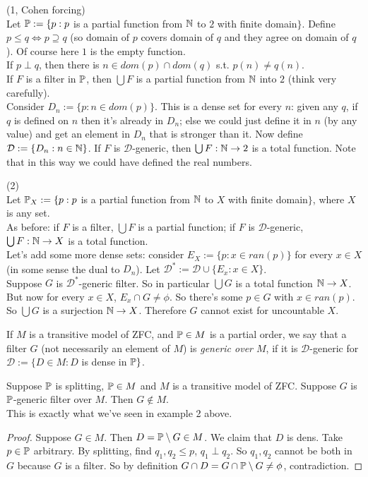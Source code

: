 \documentclass[a4paper]{article}
\begin{document}
\begin{eg} (1, Cohen forcing)\\
Let $\P := \{p: p$ is a partial function from $\N$ to $2$ with finite domain$\}$. Define $p \leq q \iff p \supseteq q$ (so domain of $p$ covers domain of $q$ and they agree on domain of $q$). Of course here $1$ is the empty function.\\
If $p\perp q$, then there is $n \in dom(p) \cap dom(q)$ s.t. $p(n) \neq q(n)$.\\
If $F$ is a filter in $\P$, then $\bigcup F$ is a partial function from $\N$ into $2$ (think very carefully).\\
Consider $D_n:=\{p:n \in dom(p)\}$. This is a dense set for every $n$: given any $q$, if $q$ is defined on $n$ then it's already in $D_n$; else we could just define it in $n$ (by any value) and get an element in $D_n$ that is stronger than it. Now define $\mathcal{D}:=\{D_n: n \in \N\}$. If $F$ is $\mathcal{D}$-generic, then $\bigcup F: \N \to 2$ is a total function. Note that in this way we could have defined the real numbers.
\end{eg}

\begin{eg} (2)\\
Let $\P_X := \{p:p$ is a partial function from $\N$ to $X$ with finite domain$\}$, where $X$ is any set.\\
As before: if $F$ is a filter, $\bigcup F$ is a partial function; if $F$ is $\mathcal{D}$-generic, $\bigcup F:\N \to X$ is a total function.\\
Let's add some more dense sets: consider $E_X:=\{p:x \in ran(p)\}$ for every $x \in X$ (in some sense the dual to $D_n$). Let $\mathcal{D}^* := \mathcal{D} \cup \{E_x: x \in X\}$.\\
Suppose $G$ is $\mathcal{D}^*$-generic filter. So in particular $\bigcup G$ is a total function $\N \to X$. But now for every $x \in X$, $E_x \cap G \neq \phi$. So there's some $p \in G$ with $x \in ran(p)$. So $\bigcup G$ is a surjection $\N \to X$. Therefore $G$ cannot exist for uncountable $X$.
\end{eg}

If $M$ is a transitive model of ZFC, and $\P \in M$ is a partial order, we say that a filter $G$ (not necessarily an element of $M$) is \emph{generic over $M$}, if it is $\mathcal{D}$-generic for $\mathcal{D}:=\{D \in M: D$ is dense in $\P\}$.

\begin{lemma}
Suppose $\P$ is splitting, $\P \in M$ and $M$ is a transitive model of ZFC. Suppose $G$ is $\P$-generic filter over $M$. Then $G \not\in M$.\\
This is exactly what we've seen in example 2 above.
\begin{proof}
Suppose $G \in M$. Then $D = \P\setminus G \in M$. We claim that $D$ is dens. Take $p \in \P$ arbitrary. By splitting, find $q_1,q_2 \leq p$, $q_1 \perp q_2$. So $q_1,q_2$ cannot be both in $G$ because $G$ is a filter. So by definition $G\cap D = G \cap \P \setminus G \neq \phi$, contradiction.
\end{proof}
\end{lemma}
\end{document}
